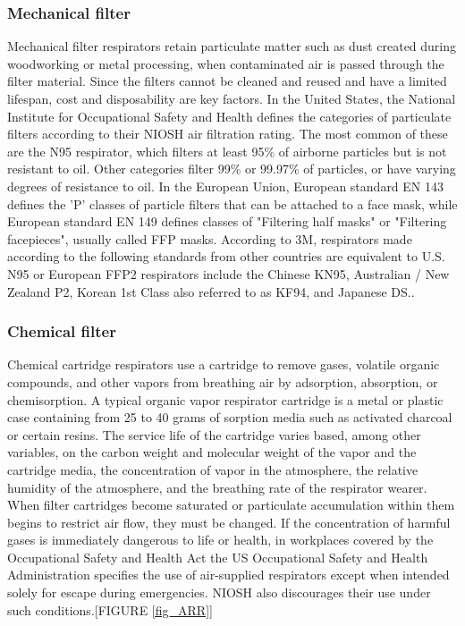 \documentclass[12pt]{article}
\begin{document}
\subsubsection{Mechanical filter}
Mechanical filter respirators retain particulate matter such as dust created during woodworking or metal processing, when contaminated air is passed through the filter material.
Since the filters cannot be cleaned and reused and have a limited lifespan, cost and disposability are key factors.
In the United States, the National Institute for Occupational Safety and Health defines the categories of particulate filters according to their NIOSH air filtration rating.
The most common of these are the N95 respirator, which filters at least 95\% of airborne particles but is not resistant to oil.
Other categories filter 99\% or 99.97\% of particles, or have varying degrees of resistance to oil.
In the European Union, European standard EN 143 defines the 'P' classes of particle filters that can be attached to a face mask, while European standard EN 149 defines classes of "Filtering half masks" or "Filtering facepieces", usually called FFP masks.
According to 3M, respirators made according to the following standards from other countries are equivalent to U.S. N95 or European FFP2 respirators include the Chinese KN95, Australian / New Zealand P2, Korean 1st Class also referred to as KF94, and Japanese DS..

\subsubsection{Chemical filter}
Chemical cartridge respirators use a cartridge to remove gases, volatile organic compounds, and other vapors from breathing air by adsorption, absorption, or chemisorption.
A typical organic vapor respirator cartridge is a metal or plastic case containing from 25 to 40 grams of sorption media such as activated charcoal or certain resins.
The service life of the cartridge varies based, among other variables, on the carbon weight and molecular weight of the vapor and the cartridge media, the concentration of vapor in the atmosphere, the relative humidity of the atmosphere, and the breathing rate of the respirator wearer.
When filter cartridges become saturated or particulate accumulation within them begins to restrict air flow, they must be changed.
If the concentration of harmful gases is immediately dangerous to life or health, in workplaces covered by the Occupational Safety and Health Act the US Occupational Safety and Health Administration specifies the use of air-supplied respirators except when intended solely for escape during emergencies.
NIOSH also discourages their use under such conditions.[FIGURE \ref{fig_ARR}]
\end{document}
